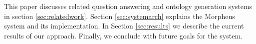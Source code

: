 This paper discusses related question answering and ontology generation systems in section \ref{sec:relatedwork}. Section \ref{sec:systemarch} explains the Morpheus system and its implementation. In Section \ref{sec:results} we describe the current results of our approach.  Finally, we conclude with future goals for the system.
